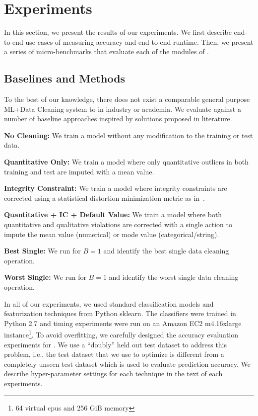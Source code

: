 \section{Experiments}\label{s:exp}
In this section, we present the results of our experiments.
We first describe end-to-end use cases of \sys measuring accuracy and end-to-end runtime.
Then, we present a series of micro-benchmarks that evaluate each of the modules of \sys.

\subsection{Baselines and Methods}
To the best of our knowledge, there does not exist a comparable general purpose ML+Data Cleaning system to \sys in industry or academia.
We evaluate \sys against a number of baseline approaches inspired by solutions proposed in literature. 

\vspace{0.25em}\noindent\textbf{No Cleaning: } We train a model without any modification to the training or test data.

\vspace{0.25em}\noindent\textbf{Quantitative Only: } We train a model where only quantitative outliers in both training and test are imputed with a mean value. 

\vspace{0.25em}\noindent\textbf{Integrity Constraint: } We train a model where integrity constraints are corrected using a statistical distortion minimization metric as in~\cite{prokoshyna2015combining}.

\vspace{0.25em}\noindent\textbf{Quantitative + IC + Default Value: } We train a model where both quantitative and qualitative violations are corrected with a single action to impute the mean value (numerical) or mode value (categorical/string).

\vspace{0.25em}\noindent\textbf{Best Single: } We run \sys for $B=1$ and identify the best single data cleaning operation.

\vspace{0.25em}\noindent\textbf{Worst Single: } We run \sys for $B=1$ and identify the worst single data cleaning operation.

\vspace{0.25em}
In all of our experiments, we used standard classification models and featurization techniques from Python \textsf{sklearn}.
The classifiers were trained in Python 2.7 and timing experiments were run on an Amazon EC2 m4.16xlarge instance\footnote{64 virtual cpus and 256 GiB memory}.
To avoid overfitting, we carefully designed the accuracy evaluation experiments for \sys.
We use a ``doubly'' held out test dataset to address this problem, i.e., the test dataset that we use to optimize \sys is different from a completely unseen test dataset which is used to evaluate prediction accuracy.
We describe hyper-parameter settings for each technique in the text of each experiments.

